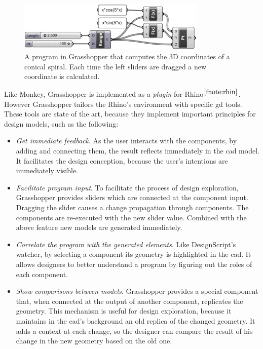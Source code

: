 \begin{figure}[!htbp]
  \centering
  \includegraphics[width=0.8\textwidth]{images/grasshopper}
    \caption{A program in Grasshopper that computes the 3D coordinates of a conical spiral. Each time the left sliders are dragged a new coordinate is calculated.}
  \label{fig:grass}
\end{figure}

Like Monkey, Grasshopper is implemented as a \textit{plugin} for Rhino$^{\ref{fnote:rhin}}$. However Grasshopper tailors the Rhino's environment with specific \gls{gd} tools. These tools are state of the art, because they implement important principles for design models, such as the following:

\begin{itemize}
 \item \textit{Get immediate feedback}. As the user interacts with the components, by adding and connecting them, the result reflects immediately in the \gls{cad} model. It facilitates the design conception, because the user's intentions are immediately visible. 
 \item \textit{Facilitate program input}. To facilitate the process of design exploration, Grasshopper provides sliders which are connected at the component input. Dragging the slider causes a change propagation through components. The components are re-executed with the new slider value. Combined with the above feature new models are generated immediately.
 \item \textit{Correlate the program with the generated elements}. Like DesignScript's watcher, by selecting a component its geometry is highlighted in the \gls{cad}. It allows designers to better understand a program by figuring out the roles of each component.
 \item \textit{Show comparisons between models}. Grasshopper provides a special component that, when connected at the output of another component, replicates the geometry. This mechanism is useful for design exploration, because it maintains in the \gls{cad}'s background an old replica of the changed geometry. It adds a context at each change, so the designer can compare the result of his change in the new geometry based on the old one.
\end{itemize}


